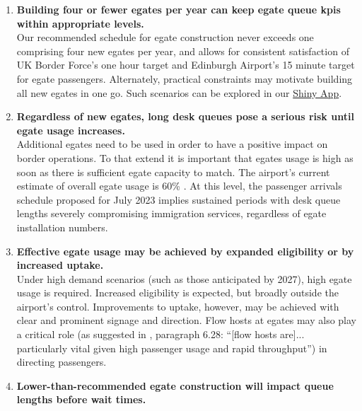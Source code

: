 \documentclass[10pt]{article}
\begin{document}
\begin{tcolorbox}[
colframe=edi-dark-purple,
colback=edi-light-purple,
fonttitle=\bfseries,
title = {Summary of Key Conclusions}]
\begin{enumerate}

    \item \textbf{Building four or fewer \glspl{egate} per year can keep \gls{egate} queue \glspl{kpi} within appropriate levels.}\\
    Our recommended schedule for \gls{egate} construction never exceeds one comprising four new \glspl{egate} per year, and allows for consistent satisfaction of UK Border Force's one hour target and Edinburgh Airport's 15 minute target for \gls{egate} passengers. Alternately, practical constraints may motivate building all new \glspl{egate} in one go. Such scenarios can be explored in our \href{https://jacob-bradley.shinyapps.io/shiny/}{Shiny App}. \\ 
    \item \textbf{Regardless of new \glspl{egate}, long desk queues pose a serious risk until \gls{egate} usage increases.}\\
     Additional \glspl{egate} need to be used in order to have a positive impact on border operations. To that extend it is important that \glspl{egate} usage is high as soon as there is sufficient \gls{egate} capacity to match. The airport's current estimate of overall \gls{egate} usage is 60\% \cite{modelling_competition}. At this level, the passenger arrivals schedule proposed for July 2023 implies sustained periods with desk queue lengths severely compromising immigration services, regardless of \gls{egate} installation numbers.\\
    
    \item \textbf{Effective \gls{egate} usage may be achieved by expanded eligibility or by increased uptake.}\\
    Under high demand scenarios (such as those anticipated by 2027), high \gls{egate} usage is required. Increased eligibility is expected, but broadly outside the airport's control. Improvements to uptake, however, may be achieved with clear and prominent signage and direction. Flow hosts at \glspl{egate} may also play a critical role (as suggested in \cite{Inspection_eGates}, paragraph 6.28: ``[flow hosts are]... particularly vital given high passenger usage and rapid throughput'') in directing passengers.\\
    
    \item \textbf{Lower-than-recommended \gls{egate} construction will impact queue lengths before wait times.}\\
\end{enumerate}
\end{tcolorbox}
\end{document}
